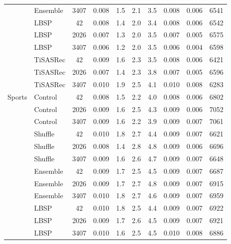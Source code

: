 \begin{longtable}{@{}llS[table-format=4.0,group-digits=false]S[table-format=1.3]S[table-format=2.1]S[table-format=2.1]S[table-format=2.1]S[table-format=1.3]S[table-format=1.3]S[table-format=5.0]@{}}
 & Ensemble & 3407 & 0.008 & 1.5 & 2.1 & 3.5 & 0.008 & 0.006 & 6541\\ %
 & LBSP & 42 & 0.008 & 1.4 & 2.0 & 3.4 & 0.008 & 0.006 & 6542\\ %
 & LBSP & 2026 & 0.007 & 1.3 & 2.0 & 3.5 & 0.007 & 0.005 & 6575\\ %
 & LBSP & 3407 & 0.006 & 1.2 & 2.0 & 3.5 & 0.006 & 0.004 & 6598\\ %
 & TiSASRec & 42 & 0.009 & 1.6 & 2.3 & 3.5 & 0.008 & 0.006 & 6421\\ %
 & TiSASRec & 2026 & 0.007 & 1.4 & 2.3 & 3.8 & 0.007 & 0.005 & 6596\\ %
 & TiSASRec & 3407 & 0.010 & 1.9 & 2.5 & 4.1 & 0.010 & 0.008 & 6283\\ %
\midrule
Sports & Control & 42 & 0.008 & 1.5 & 2.2 & 4.0 & 0.008 & 0.006 & 6802\\ %
 & Control & 2026 & 0.009 & 1.6 & 2.5 & 4.3 & 0.009 & 0.006 & 7052\\ %
 & Control & 3407 & 0.009 & 1.6 & 2.2 & 3.9 & 0.009 & 0.007 & 7061\\ %
 & Shuffle & 42 & 0.010 & 1.8 & 2.7 & 4.4 & 0.009 & 0.007 & 6621\\ %
 & Shuffle & 2026 & 0.008 & 1.4 & 2.8 & 4.8 & 0.009 & 0.006 & 6696\\ %
 & Shuffle & 3407 & 0.009 & 1.6 & 2.6 & 4.7 & 0.009 & 0.007 & 6648\\ %
 & Ensemble & 42 & 0.009 & 1.7 & 2.5 & 4.5 & 0.009 & 0.007 & 6687\\ %
 & Ensemble & 2026 & 0.009 & 1.7 & 2.7 & 4.8 & 0.009 & 0.007 & 6915\\ %
 & Ensemble & 3407 & 0.010 & 1.8 & 2.7 & 4.6 & 0.009 & 0.007 & 6959\\ %
 & LBSP & 42 & 0.010 & 1.8 & 2.5 & 4.4 & 0.009 & 0.007 & 6922\\ %
 & LBSP & 2026 & 0.009 & 1.7 & 2.6 & 4.5 & 0.009 & 0.007 & 6921\\ %
 & LBSP & 3407 & 0.010 & 1.6 & 2.5 & 4.5 & 0.010 & 0.008 & 6886\\ %

\end{longtable}
